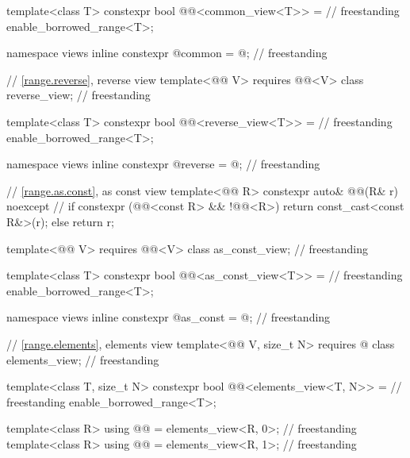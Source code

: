 \begin{codeblock}
{  template<class T>
    constexpr bool @@<common_view<T>> =                          // freestanding
      enable_borrowed_range<T>;

  namespace views { inline constexpr @\unspecnc@ common = @\unspecnc@; }            // freestanding

  // \ref{range.reverse}, reverse view
  template<@@ V>
    requires @@<V>
  class reverse_view;                                                               // freestanding

  template<class T>
    constexpr bool @@<reverse_view<T>> =                         // freestanding
      enable_borrowed_range<T>;

  namespace views { inline constexpr @\unspecnc@ reverse = @\unspecnc@; }           // freestanding

  // \ref{range.as.const}, as const view
  template<@@ R>
    constexpr auto& @@(R& r) noexcept { // \expos
      if constexpr (@@<const R> && !@@<R>) {
        return const_cast<const R&>(r);
      } else {
        return r;
      }
    }

  template<@@ V>
    requires @@<V>
  class as_const_view;                                                              // freestanding

  template<class T>
    constexpr bool @@<as_const_view<T>> =                        // freestanding
      enable_borrowed_range<T>;

  namespace views { inline constexpr @\unspecnc@ as_const = @\unspecnc@; }          // freestanding

  // \ref{range.elements}, elements view
  template<@@ V, size_t N>
    requires @\seebelow@
  class elements_view;                                                              // freestanding

  template<class T, size_t N>
    constexpr bool @@<elements_view<T, N>> =                     // freestanding
      enable_borrowed_range<T>;

  template<class R>
    using @@ = elements_view<R, 0>;                                          // freestanding
  template<class R>
    using @@ = elements_view<R, 1>;                                        // freestanding

}
\end{codeblock}
